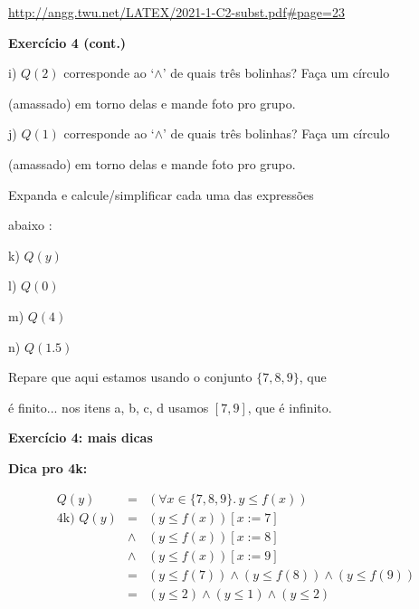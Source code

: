 \documentclass[oneside,12pt]{article}
\begin{document}

{\footnotesize

\url{http://angg.twu.net/LATEX/2021-1-C2-subst.pdf\#page=23}

}

\msk



\newpage

{\bf Exercício 4 (cont.)}

\ssk

i) $Q(2)$ corresponde ao `$∧$' de quais três bolinhas? Faça um círculo

(amassado) em torno delas e mande foto pro grupo.

j) $Q(1)$ corresponde ao `$∧$' de quais três bolinhas? Faça um círculo

(amassado) em torno delas e mande foto pro grupo.

\bsk

Expanda e calcule/simplificar cada uma das expressões

abaixo :

\ssk

k) $Q(y)$

l) $Q(0)$

m) $Q(4)$

n) $Q(1.5)$

\msk

Repare que aqui estamos usando o conjunto $\{7,8,9\}$, que

é finito... nos itens a, b, c, d usamos $[7,9]$, que é infinito.

\newpage


{\bf Exercício 4: mais dicas}

\ssk

{\bf Dica pro 4k:}

$$\begin{array}{rcl}
              Q(y) &=& (∀x∈\{7,8,9\}. \, y≤f(x)) \\[5pt]
  \text{4k) } Q(y) &=& (y≤f(x))[x:=7] \\
                    &∧& (y≤f(x))[x:=8] \\
                    &∧& (y≤f(x))[x:=9] \\
                   &=& (y≤f(7)) ∧ (y≤f(8)) ∧ (y≤f(9)) \\
                   &=& (y≤2) ∧ (y≤1) ∧ (y≤2) \\
  \end{array}
$$
\end{document}
